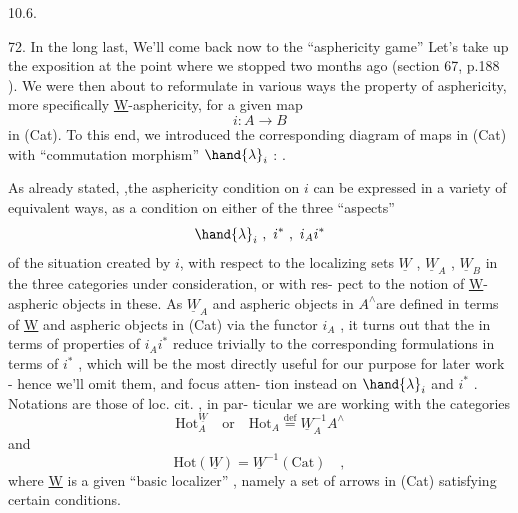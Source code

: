 
10.6.

72. In the long last, We'll come back now to the ``asphericity game''\hand{!}
 Let's take up the exposition at the point where we stopped
two months ago (section 67, p.188 ). We were then about to reformulate
in various ways the property of asphericity, more specifically
\underline{W}-asphericity, for a given map
\[ i : A \longrightarrow B \]
in (Cat). To this end, we introduced the corresponding diagram of maps
in (Cat) with ``commutation morphism'' $\hand{\lambda}_i$ :
\hfill .

As already stated, ,the asphericity condition on $i$ can be expressed 
in a variety of equivalent ways, as a condition on either of the three
``aspects''
\[ \hand{\lambda}_i \ , \ i^{*} \ , \ i_A i^{*} \]
of the situation created by $i$, with respect to the localizing sets
$\underline{W}$ , $\underline{W}_A$ , $\underline{W}_B$ in the three categories under consideration, or with res-%
pect to the notion of \underline{W}-aspheric objects in these. As $\underline{W}_A$\hand{,} and aspheric
objects in $A^{\wedge}$\hand{,}are defined  in terms of \underline{W} and aspheric objects in (Cat)
via the functor $i_A$ , it turns out that the  in terms of
properties of $i_A i^{*}$ reduce trivially to the corresponding formulations
in terms of $i^{*}$ , which will be the most directly useful for our 
 purpose for later work - hence we'll omit them, and focus atten-%
tion instead on $\hand{\lambda}_i$ and $i^{*}$ . Notations are those of loc. cit. , in par-%
ticular we are working with the categories
\[ \mathrm{Hot}^{\underline{W}}_{A} \quad \text{or} \quad \mathrm{Hot}_A \overset{\mathrm{def}}{=} \underline{W}_A^{-1} A^{\wedge} \]
and
\[ \mathrm{Hot}(\underline{W}) = \underline{W}^{-1} (\mathrm{Cat}) \quad , \]
where \underline{W} is a given ``basic localizer'' , namely a set of arrows in (Cat)
satisfying certain conditions.

